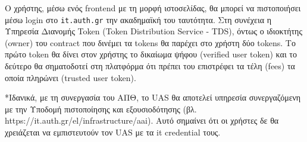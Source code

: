 O χρήστης, μέσω ενός frontend με τη μορφή ιστοσελίδας, θα μπορεί να πιστοποιήσει μέσω login στο \texttt{it.auth.gr} την
ακαδημαϊκή του ταυτότητα. Στη συνέχεια η Υπηρεσία Διανομής Token (Token Distribution Service - TDS), όντως ο ιδιοκτήτης
(owner) του contract που δινέμει τα tokens θα παρέχει στο χρήστη δύο tokens. Το πρώτο token θα δίνει στον χρήστης το
δικαίωμα ψήφου (verified user token) και το δεύτερο θα σηματοδοτεί στη πλατφόρμα ότι πρέπει του επιστρέφει τα τέλη
(fees) τα οποία πληρώνει (trusted user token).

*Ιδανικά, με τη συνεργασία του ΑΠΘ, το UAS θα αποτελεί υπηρεσία συνεργαζόμενη με την Υποδομή πιστοποίησης και
εξουσιοδότησης (βλ. https://it.auth.gr/el/infrastructure/aai). Αυτό σημαίνει ότι οι χρήστες δε θα χρειάζεται να
εμπιστευτούν τον UAS με τα it credential τους.
